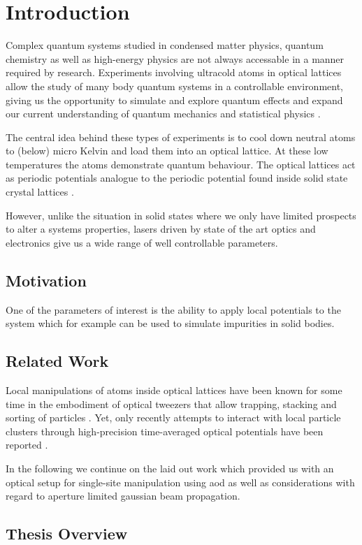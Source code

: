 \chapter{Introduction}

Complex quantum systems studied in condensed matter physics, quantum chemistry
as well as high-energy physics are not always accessable in a manner
required by research. Experiments involving ultracold atoms in optical
lattices allow the study of many body quantum systems in a controllable
environment, giving us the opportunity to simulate and explore quantum
effects and expand our current understanding of quantum mechanics and
statistical physics \cite{Gross2017}.

The central idea behind these types of experiments is to cool down neutral
atoms to (below) micro Kelvin and load them into an optical lattice. At these
low temperatures the atoms demonstrate quantum behaviour. The optical lattices
act as periodic potentials analogue to the periodic potential found inside
solid state crystal lattices \cite{Lewenstein2007}.

However, unlike the situation in solid states where we only have limited
prospects to alter a systems properties, lasers driven by state of the art
optics and electronics give us a wide range of well controllable parameters.

\section{Motivation}

One of the parameters of interest is the ability to apply local potentials
to the system which for example can be used to simulate impurities in solid
bodies.

\section{Related Work}


Local manipulations of atoms inside optical lattices have been known for some
time in the embodiment of optical tweezers that allow trapping, stacking and
sorting of particles \cite{Tadmor2004}. Yet, only recently attempts to
interact with local particle clusters through high-precision time-averaged
optical potentials have been reported \cite{Roy2016}.

In the following we continue on the laid out work \cite{Hertlein2017} which
provided us with an optical setup for single-site manipulation using
\gls{aod} as well as considerations with regard to aperture limited
gaussian beam propagation.

\section{Thesis Overview}
